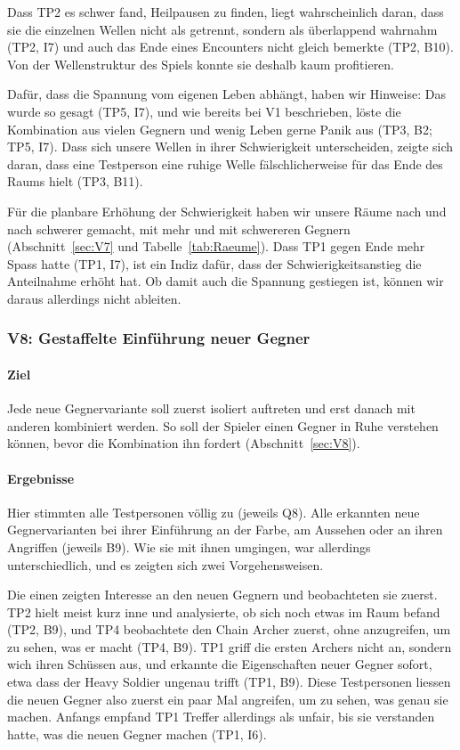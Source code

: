 \documentclass[../Main.tex]{subfiles}
\begin{document}
Dass TP2 es schwer fand, Heilpausen zu finden, liegt wahrscheinlich daran, dass sie die einzelnen Wellen nicht als getrennt, sondern als überlappend wahrnahm (TP2, I7) und auch das Ende eines Encounters nicht gleich bemerkte (TP2, B10). Von der Wellenstruktur des Spiels konnte sie deshalb kaum profitieren.

Dafür, dass die Spannung vom eigenen Leben abhängt, haben wir Hinweise: Das wurde so gesagt (TP5, I7), und wie bereits bei V1 beschrieben, löste die Kombination aus vielen Gegnern und wenig Leben gerne Panik aus (TP3, B2; TP5, I7). Dass sich unsere Wellen in ihrer Schwierigkeit unterscheiden, zeigte sich daran, dass eine Testperson eine ruhige Welle fälschlicherweise für das Ende des Raums hielt (TP3, B11).

Für die planbare Erhöhung der Schwierigkeit haben wir unsere Räume nach und nach schwerer gemacht, mit mehr und mit schwereren Gegnern (Abschnitt~\ref{sec:V7} und Tabelle~\ref{tab:Raeume}). Dass TP1 gegen Ende mehr Spass hatte (TP1, I7), ist ein Indiz dafür, dass der Schwierigkeitsanstieg die Anteilnahme erhöht hat. Ob damit auch die Spannung gestiegen ist, können wir daraus allerdings nicht ableiten.

\subsubsection{V8: Gestaffelte Einführung neuer Gegner}

\paragraph{Ziel}
Jede neue Gegnervariante soll zuerst isoliert auftreten und erst danach mit anderen kombiniert werden. So soll der Spieler einen Gegner in Ruhe verstehen können, bevor die Kombination ihn fordert (Abschnitt~\ref{sec:V8}).

\paragraph{Ergebnisse}
Hier stimmten alle Testpersonen völlig zu (jeweils Q8). Alle erkannten neue Gegnervarianten bei ihrer Einführung an der Farbe, am Aussehen oder an ihren Angriffen (jeweils B9). Wie sie mit ihnen umgingen, war allerdings unterschiedlich, und es zeigten sich zwei Vorgehensweisen.

Die einen zeigten Interesse an den neuen Gegnern und beobachteten sie zuerst. TP2 hielt meist kurz inne und analysierte, ob sich noch etwas im Raum befand (TP2, B9), und TP4 beobachtete den Chain Archer zuerst, ohne anzugreifen, um zu sehen, was er macht (TP4, B9). TP1 griff die ersten Archers nicht an, sondern wich ihren Schüssen aus, und erkannte die Eigenschaften neuer Gegner sofort, etwa dass der Heavy Soldier ungenau trifft (TP1, B9). Diese Testpersonen liessen die neuen Gegner also zuerst ein paar Mal angreifen, um zu sehen, was genau sie machen. Anfangs empfand TP1 Treffer allerdings als unfair, bis sie verstanden hatte, was die neuen Gegner machen (TP1, I6).
\end{document}
